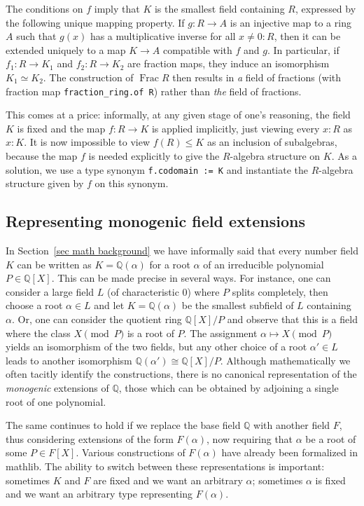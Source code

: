 \documentclass[a4paper,USenglish,cleveref, autoref, thm-restate]{lipics-v2021}
\newcommand{\lean}[1]{\texttt{#1}\xspace}
\newcommand{\mathlib}{\textsf{mathlib}\xspace}
\newcommand{\Q}{\mathbb{Q}}
\DeclareMathOperator{\Frac}{Frac}
\begin{document}
The conditions on $f$ imply that $K$ is the smallest field containing $R$, expressed by the following unique mapping property.
If $g \colon R \to A$ is an injective map to a ring $A$ such that $g(x)$ has a multiplicative inverse for all $x \ne 0 : R$, then
it can be extended uniquely to a map $K \to A$ compatible with $f$ and $g$.
In particular, if $f_1 \colon R \to K_1$ and $f_2 \colon R \to K_2$ are fraction maps, they induce an isomorphism $K_1 \simeq K_2$.
The construction of $\Frac R$ then results in \emph{a} field of fractions (with fraction map \lean{fraction\_ring.of R}) rather than \emph{the} field of fractions.

This comes at a price:
informally, at any given stage of one's reasoning, the field $K$ is fixed and the map $f\colon R\to K$ is applied implicitly, just viewing every $x:R$ as $x:K$.
It is now impossible to view $f(R) \leq K$ as an inclusion of subalgebras,
because the map $f$ is needed explicitly to give the $R$-algebra structure on $K$.
As a solution, we use a type synonym \lean{f.codomain := K} and instantiate the $R$-algebra structure given by $f$ on this synonym.

\subsection{Representing monogenic field extensions} \label{sec:monogenic-field-extension}

In Section~\ref{sec math background} we have informally said that every number field $K$ can be written as $K=\Q(\alpha)$ for a root $\alpha$ of an irreducible polynomial $P\in\Q[X]$. This can be made precise in several ways. For instance, one can consider a large field $L$ (of characteristic $0$) where $P$ splits completely, then choose a root $\alpha\in L$ and let $K = \Q(\alpha)$ be the smallest subfield of $L$ containing $\alpha$. Or, one can consider the quotient ring $\Q[X]/P$ and observe that this is a field where the class $X\pmod{P}$ is a root of $P$. The assignment $\alpha\mapsto X\pmod{P}$ yields an isomorphism of the two fields, but any other choice of a root $\alpha'\in L$ leads to another isomorphism $\Q(\alpha')\cong \Q[X]/P$. Although mathematically we often tacitly identify the constructions, there is no canonical representation of the \emph{monogenic} extensions of $\Q$, those which can be obtained by adjoining a single root of one polynomial.

The same continues to hold if we replace the base field $\Q$ with another field $F$, thus considering extensions of the form $F(\alpha)$, now requiring that $\alpha$ be a root of some $P\in F[X]$. Various constructions of $F(\alpha)$ have already been formalized in \mathlib. The ability to switch between these representations is important: sometimes $K$ and $F$ are fixed and we want an arbitrary $\alpha$; sometimes $\alpha$ is fixed and we want an arbitrary type representing $F(\alpha)$.
\end{document}
